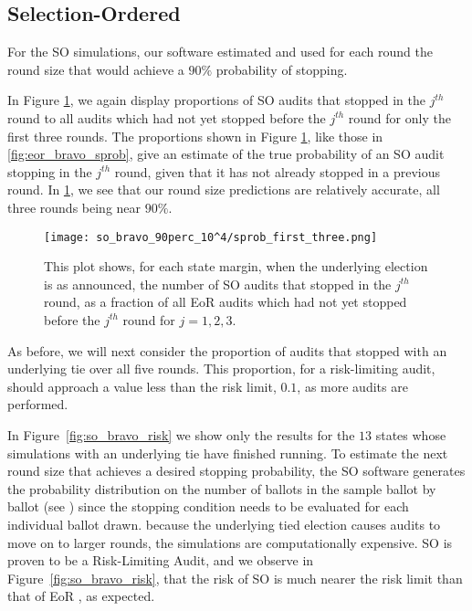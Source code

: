 \subsection{Selection-Ordered \BRAVO}
For the SO \BRAVO simulations, our software estimated and used for each round
the round size that would achieve a $90\%$ probability of stopping.

In Figure \ref{fig:so_bravo_sprob}, we again display proportions of SO \BRAVO audits that stopped in the $j^{th}$ round
to all audits which had not yet stopped before the $j^{th}$ round for only the first three rounds.
The proportions shown in Figure \ref{fig:so_bravo_sprob}, like those in \ref{fig:eor_bravo_sprob}, give an estimate
of the true probability of an SO \BRAVO audit stopping in the $j^{th}$ round,
given that it has not already stopped in a previous round. 
In \ref{fig:so_bravo_sprob}, we see that our round size predictions are relatively accurate,
all three rounds being near $90\%$.

\begin{figure}
\texttt{[image: so\_bravo\_90perc\_10^4/sprob\_first\_three.png]}\caption{
This plot shows, for each state margin, when the underlying election is as announced, the number of SO \BRAVO audits that stopped in the $j^{th}$ round,
as a fraction of all EoR \BRAVO audits which had not yet stopped before the $j^{th}$ round for $j=1,2,3$.}
\label{fig:so_bravo_sprob}
\end{figure}

As before, we will next consider the proportion of audits that stopped with an underlying tie over all five rounds.
This proportion, for a risk-limiting audit, should approach a value less than the risk limit, 
$0.1$, as more audits are performed.

In Figure~\ref{fig:so_bravo_risk} we show only the results for the $13$
states whose simulations with an underlying tie have finished running.
To estimate the next round size that achieves a desired stopping probability,
the SO \BRAVO software generates the probability distribution on the number of ballots in the sample ballot by ballot (see \cite{usenix_minerva}) since
the stopping condition needs to be evaluated for each individual ballot drawn.
because the underlying tied election causes audits to move on to larger rounds, 
the simulations are computationally expensive. SO \BRAVO is proven to be a Risk-Limiting Audit,
and we observe in Figure~\ref{fig:so_bravo_risk},
that the risk of SO \BRAVO is much
nearer the risk limit than that of EoR \BRAVO, as expected. 

